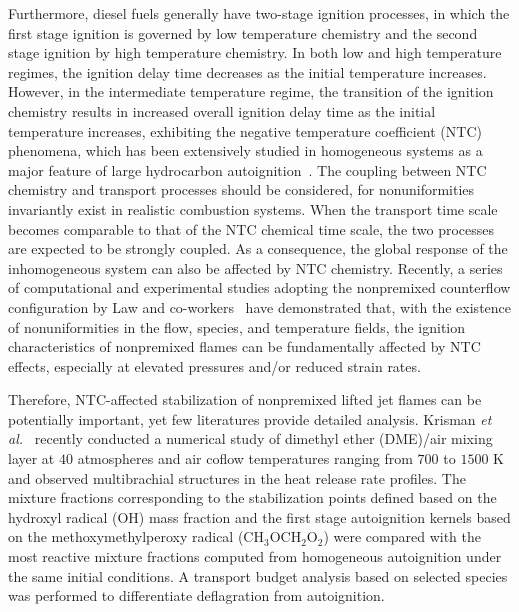 \documentclass[review,3p,times]{elsarticle}
\begin{document}
Furthermore, diesel fuels generally have two-stage ignition processes, in which the first stage ignition is governed by low temperature chemistry and the second stage ignition by high temperature chemistry.  In both low and high temperature regimes, the ignition delay time decreases as the initial temperature increases.  However, in the intermediate temperature regime, the transition of the ignition chemistry results in increased overall ignition delay time as the initial temperature increases, exhibiting the negative temperature coefficient (NTC) phenomena, which has been extensively studied in homogeneous systems as a major feature of large hydrocarbon autoignition~\cite{zador11}.  The coupling between NTC chemistry and transport processes should be considered, for nonuniformities invariantly exist in realistic combustion systems.  When the transport time scale becomes comparable to that of the NTC chemical time scale, the two processes are expected to be strongly coupled.  As a consequence, the global response of the inhomogeneous system can also be affected by NTC chemistry.  Recently, a series of computational and experimental studies adopting the nonpremixed counterflow configuration by Law and co-workers~\cite{law12,zhao13,deng14} have demonstrated that, with the existence of nonuniformities in the flow, species, and temperature fields, the ignition characteristics of nonpremixed flames can be fundamentally affected by NTC effects, especially at elevated pressures and/or reduced strain rates.   

Therefore, NTC-affected stabilization of nonpremixed lifted jet flames can be potentially important, yet few literatures provide detailed analysis.  Krisman \emph{et al.}~\cite{krisman14} recently conducted a numerical study of dimethyl ether (DME)/air mixing layer at $40$ atmospheres and air coflow temperatures ranging from $700$ to $1500$ K and observed multibrachial structures in the heat release rate profiles.  The mixture fractions corresponding to the stabilization points defined based on the hydroxyl radical (OH) mass fraction and the first stage autoignition kernels based on the methoxymethylperoxy radical (CH$_3$OCH$_2$O$_2$) were compared with the most reactive mixture fractions computed from homogeneous autoignition under the same initial conditions.  A transport budget analysis based on selected species was performed to differentiate deflagration from autoignition.
\end{document}

